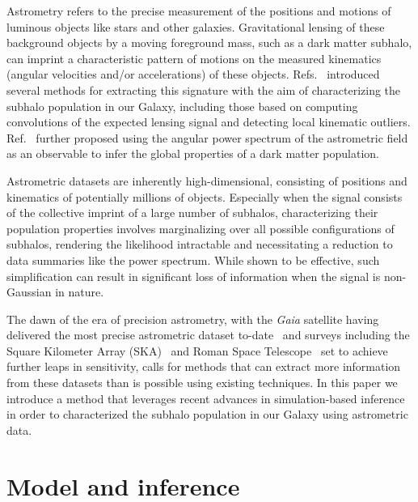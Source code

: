 \documentclass[]{article}
\begin{document}
Astrometry refers to the precise measurement of the positions and motions of luminous objects like stars and other galaxies. Gravitational lensing of these background objects by a moving foreground mass, such as a dark matter subhalo, can imprint a characteristic pattern of motions on the measured kinematics (angular velocities and/or accelerations) of these objects. Refs.~\cite{VanTilburg:2018ykj,Mondino:2020rkn} introduced several methods for extracting this signature with the aim of characterizing the subhalo population in our Galaxy, including those based on computing convolutions of the expected lensing signal and detecting local kinematic outliers. Ref.~\cite{Mishra-Sharma:2020ynk} further proposed using the angular power spectrum of the astrometric field as an observable to infer the global properties of a dark matter population.  %

Astrometric datasets are inherently high-dimensional, consisting of positions and kinematics of potentially millions of objects. Especially when the signal consists of the collective imprint of a large number of subhalos, characterizing their population properties involves marginalizing over all possible configurations of subhalos, rendering the likelihood intractable and necessitating a reduction to data summaries like the power spectrum. While shown to be effective, such simplification can result in significant loss of information when the signal is non-Gaussian in nature. %

The dawn of the era of precision astrometry, with the \emph{Gaia} satellite having delivered the most precise astrometric dataset to-date~\cite{2016A&A...595A...1G,2018A&A...616A...1G,2018A&A...616A...2L} and surveys including the Square Kilometer Array (SKA)~\cite{Fomalont:2004hr,Jarvis:2015tqa} and Roman Space Telescope~\cite{2019JATIS...5d4005W} set to achieve further leaps in sensitivity, calls for methods that can extract more information from these datasets than is possible using existing techniques. In this paper we introduce a method that leverages recent advances in simulation-based inference %
in order to characterized the subhalo population in our Galaxy using astrometric data.

\section{Model and inference}
\label{sec:model}
\end{document}
